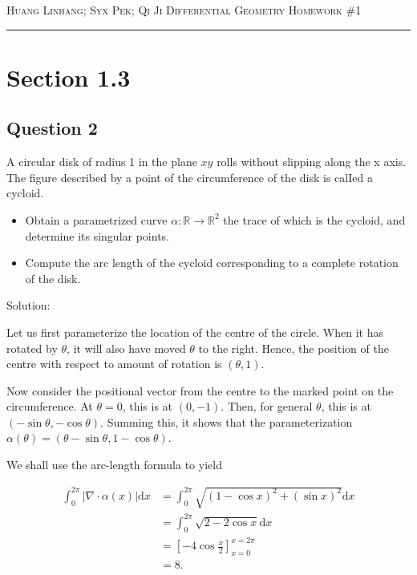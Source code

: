 \documentclass[12pt]{article}
\begin{document}
\thispagestyle{empty}

{\scshape Huang Linhang; Syx Pek; Qi Ji} \hfill {\scshape \large Differential Geometry} \hfill {\scshape Homework \#1}

\smallskip
\hrule
\bigskip

\section{Section 1.3}

\subsection*{Question 2}

A circular disk of radius 1 in the plane $xy$ rolls without slipping along the x
axis. The figure described by a point of the circumference of the disk is calIed a
cycloid.

\begin{itemize}
     \item Obtain a parametrized curve $\alpha : \mathbb{R} \to \mathbb{R}^2$ the trace of which is the cycloid,
and determine its singular points.
     \item Compute the arc length of the cycloid corresponding to a complete rotation
     of the disk.
\end{itemize}

Solution:

Let us first parameterize the location of the centre of the 
circle. When it has rotated by $\theta$, it will also have moved $\theta$ to the right.
Hence, the position of the centre with respect to amount of rotation is $(\theta, 1)$.

Now consider the positional vector from the centre to the marked point
on the circumference. At $\theta = 0$, this is at $(0, -1)$. Then, for general $\theta$, 
this is at $(-\sin\theta, -\cos\theta)$. Summing this, it shows that the parameterization $\alpha(\theta) = (\theta - \sin\theta, 1 - \cos\theta)$.

We shall use the arc-length formula to yield

\begin{align*}
     \int_0^{2\pi} |\nabla\cdot \alpha(x)| \mathrm{d}x 
     &= \int_0^{2\pi} \sqrt{(1-\cos x)^2 + (\sin x)^2} \mathrm{d}x  \\
     &=\int_0^{2\pi} \sqrt{2 - 2\cos{x}} \mathrm{d}x \\
     &= \left[-4\cos{\frac x2}\right]^{x = 2\pi}_{x = 0} \\
     &= 8.
\end{align*}
\end{document}

